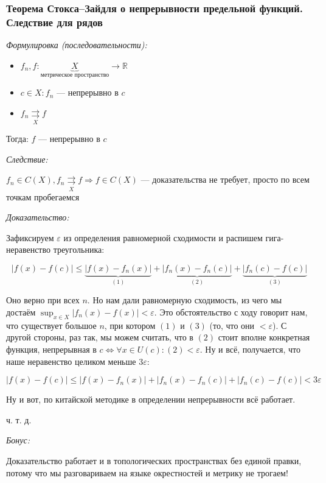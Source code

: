 \documentclass{article}
\def\rsh#1{\underset{#1}{\rightrightarrows}}
\begin{document}
\subsubsection{Теорема Стокса--Зайдля о непрерывности предельной функций. Следствие для рядов}

\textit{Формулировка (последовательности):}

\begin{itemize}
    \item $f_n, f: \underbrace{X}_{\text{метрическое пространство}} \rightarrow \mathbb{R}$
    \item $c \in X: f_n$ --- непрерывно в $c$  
    \item $f_n \rsh{X} f$
\end{itemize}

Тогда: $f$ --- непрерывно в $c$

\textit{Следствие:}

$f_n \in C(X), f_n \rsh{X} f \Rightarrow f \in C(X)$ --- доказательства не требует, просто по всем точкам пробегаемся

\textit{Доказательство:}

Зафиксируем $\varepsilon$ из определения равномерной сходимости и распишем гига-неравенство треугольника:

\[|f(x) - f(c)| \le \underbrace{|f(x) - f_n(x)|}_{(1)} + \underbrace{|f_n(x) - f_n(c)|}_{(2)} + \underbrace{|f_n(c) - f(c)|}_{(3)}\]

Оно верно при всех $n$. Но нам дали равномерную сходимость, из чего мы достаём $\sup_{x \in X} |f_n(x) - f(x)| < \varepsilon$. Это обстоятельство с ходу говорит нам, что существует большое $n$, при котором $(1)$ и $(3)$ (то, что они $< \varepsilon$). С другой стороны, раз так, мы можем считать, что в $(2)$ стоит вполне конкретная функция, непрерывная в $c \Leftrightarrow \forall x \in U(c): (2) < \varepsilon$. Ну и всё, получается, что наше неравенство целиком меньше $3 \varepsilon$:

\[|f(x) - f(c)| \le |f(x) - f_n(x)| + |f_n(x) - f_n(c)| + |f_n(c) - f(c)| < 3\varepsilon\]

Ну и вот, по китайской методике в определении непрерывности всё работает.

ч. т. д.

\textit{Бонус:}

\Smiley 

Доказательство работает и в топологических пространствах без единой правки, потому что мы разговариваем на языке окрестностей и метрику не трогаем!
\end{document}

